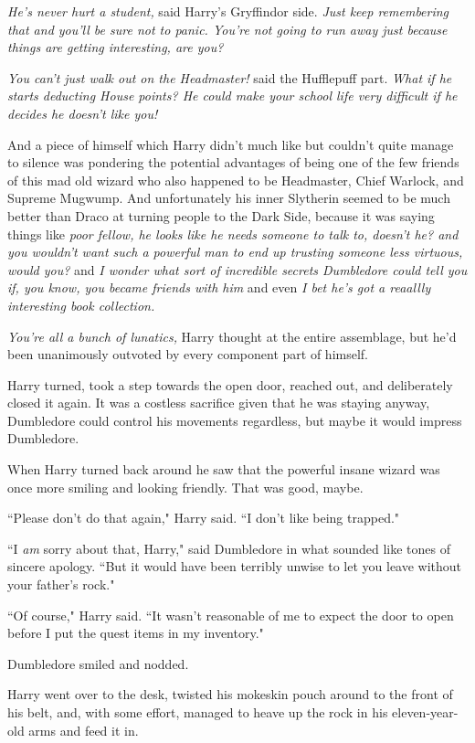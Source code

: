 \emph{He's never hurt a student,} said Harry's Gryffindor side. \emph{Just keep remembering that and you'll be sure not to panic. You're not going to run away just because things are getting interesting, are you?}

\emph{You can't just walk out on the Headmaster!} said the Hufflepuff part. \emph{What if he starts deducting House points? He could make your school life very difficult if he decides he doesn't like you!}

And a piece of himself which Harry didn't much like but couldn't quite manage to silence was pondering the potential advantages of being one of the few friends of this mad old wizard who also happened to be Headmaster, Chief Warlock, and Supreme Mugwump. And unfortunately his inner Slytherin seemed to be much better than Draco at turning people to the Dark Side, because it was saying things like \emph{poor fellow, he looks like he needs someone to talk to, doesn't he? \emph{and} you wouldn't want such a powerful man to end up trusting someone less virtuous, would you?} and \emph{I wonder what sort of incredible secrets Dumbledore could tell you if, you know, you became friends with him} and even \emph{I bet he's got a reaallly interesting book collection.}

\emph{You're all a bunch of lunatics,} Harry thought at the entire assemblage, but he'd been unanimously outvoted by every component part of himself.

Harry turned, took a step towards the open door, reached out, and deliberately closed it again. It was a costless sacrifice given that he was staying anyway, Dumbledore could control his movements regardless, but maybe it would impress Dumbledore.

When Harry turned back around he saw that the powerful insane wizard was once more smiling and looking friendly. That was good, maybe.

``Please don't do that again," Harry said. ``I don't like being trapped."

``I \emph{am} sorry about that, Harry," said Dumbledore in what sounded like tones of sincere apology. ``But it would have been terribly unwise to let you leave without your father's rock."

``Of course," Harry said. ``It wasn't reasonable of me to expect the door to open before I put the quest items in my inventory."

Dumbledore smiled and nodded.

Harry went over to the desk, twisted his mokeskin pouch around to the front of his belt, and, with some effort, managed to heave up the rock in his eleven-year-old arms and feed it in.

